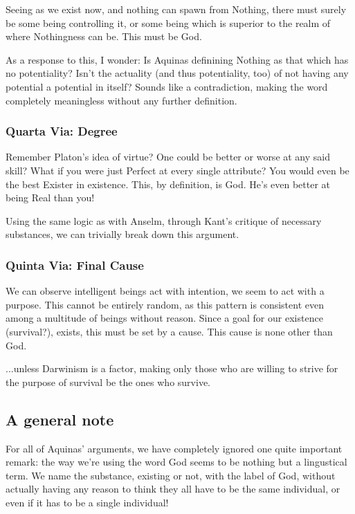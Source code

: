 \documentclass{article}
\begin{document}
	Seeing as we exist now, and nothing can spawn from Nothing, there must surely be some being controlling it, or some being which is superior to the realm of where Nothingness can be. This must be God.

	As a response to this, I wonder: Is Aquinas definining Nothing as that which has no potentiality? Isn't the actuality (and thus potentiality, too) of not having any potential a potential in itself? Sounds like a contradiction, making the word completely meaningless without any further definition.


	\subsubsection*{Quarta Via: Degree}
	Remember Platon's idea of virtue? One could be better or worse at any said skill? What if you were just Perfect at every single attribute? You would even be the best Exister in existence. This, by definition, is God. He's even better at being Real than you!

	Using the same logic as with Anselm, through Kant's critique of necessary substances, we can trivially break down this argument.

	\subsubsection*{Quinta Via: Final Cause}
	We can observe intelligent beings act with intention, we seem to act with a purpose. This cannot be entirely random, as this pattern is consistent even among a multitude of beings without reason. Since a goal for our existence (survival?),  exists, this must be set by a cause. This cause is none other than God.

	...unless Darwinism is a factor, making only those who are willing to strive for the purpose of survival be the ones who survive.

	\subsection*{A general note}

	For all of Aquinas' arguments, we have completely ignored one quite important remark: the way we're using the word God seems to be nothing but a lingustical term. We name the substance, existing or not, with the label of God, without actually having any reason to think they all have to be the same individual, or even if it has to be a single individual!
\end{document}

